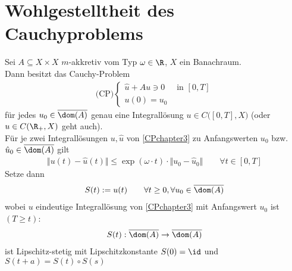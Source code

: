
\chapter{Wohlgestelltheit des Cauchyproblems} %
\setcounter{section}{1}
\begin{theorem}\label{theoremCrandall-Liggett}\enter
Sei $A\subseteq X\times X$ $m$-akkretiv vom Typ $\omega\in\R$, $X$ ein Banachraum.\\
Dann besitzt das Cauchy-Problem
\begin{align}\label{CPchapter3}\tag{CP}
\text{(CP)}\left\lbrace\begin{array}{rl}
\hat{u}+Au\ni 0&\text{ in }[0,T]\\
u(0)=u_0&
\end{array}\right.
\end{align}
für jedes $u_0\in\overline{\dom(A)}$ genau eine Integrallösung $u\in C\big([0,T],X\big)$ (oder $u\in C(\R_+,X)$ geht auch).\\
Für je zwei Integrallösungen $u,\hat{u}$ von \eqref{CPchapter3} zu Anfangswerten $u_0$ bzw. $\hat{u}_0\in\overline{\dom(A)}$ gilt
\begin{align*}
\big\Vert u(t)-\hat{u}(t)\big\Vert
\leq\exp(\omega\cdot t)\cdot\big\Vert u_0-\hat{u}_0\big\Vert\qquad\forall t\in[0,T]
\end{align*}
Setze dann
\begin{align*}
S(t):=u(t)\qquad\forall t\geq0,\forall u_0\in\overline{\dom(A)}
\end{align*}
wobei $u$ eindeutige Integrallösung von \eqref{CPchapter3} mit Anfangswert $u_0$ ist $(T\geq t)$:
\begin{align*}
S(t):\overline{\dom(A)}\to\overline{\dom(A)}
\end{align*}
ist Lipschitz-stetig mit Lipschitzkonstante $S(0)=\id$ und $S(t+a)=S(t)\circ S(s)$
\end{theorem}

